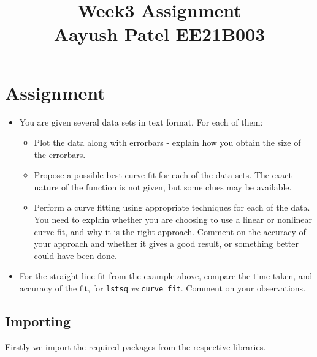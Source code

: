 \documentclass[11pt]{article}
\title{Week3 Assignment\\
    Aayush Patel EE21B003}
\providecommand{\tightlist}{%
      \setlength{\itemsep}{0pt}\setlength{\parskip}{0pt}}
\begin{document}
    
    \maketitle
    
    

    
    \hypertarget{assignment}{%
\section{Assignment}\label{assignment}}

\begin{itemize}
\tightlist
\item
  You are given several data sets in text format. For each of them:

  \begin{itemize}
  \tightlist
  \item
    Plot the data along with errorbars - explain how you obtain the size
    of the errorbars.
  \item
    Propose a possible best curve fit for each of the data sets. The
    exact nature of the function is not given, but some clues may be
    available.\\
  \item
    Perform a curve fitting using appropriate techniques for each of the
    data. You need to explain whether you are choosing to use a linear
    or nonlinear curve fit, and why it is the right approach. Comment on
    the accuracy of your approach and whether it gives a good result, or
    something better could have been done.
  \end{itemize}
\item
  For the straight line fit from the example above, compare the time
  taken, and accuracy of the fit, for \texttt{lstsq} \emph{vs}
  \texttt{curve\_fit}. Comment on your observations.
\end{itemize}

    \hypertarget{importing}{%
\subsection{Importing}\label{importing}}

Firstly we import the required packages from the respective libraries.
\end{document}
